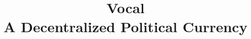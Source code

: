 \documentclass[conference]{IEEEtran}
\begin{document}
    \title{Vocal\\ A Decentralized Political Currency }
    
    \author{
    \and
    \and
    }
    
    
    
    
    \maketitle
    
\end{document}
